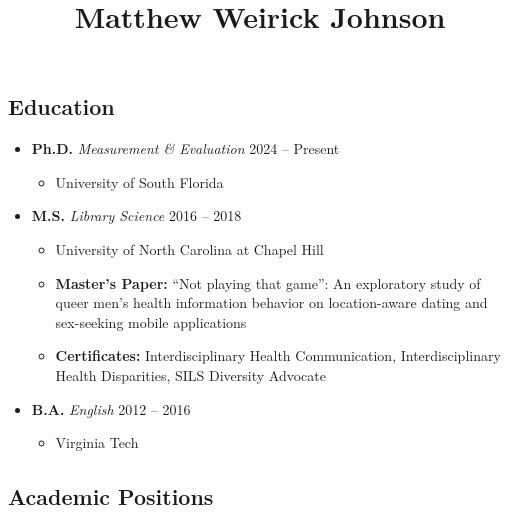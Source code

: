 \documentclass[
  letterpaper,
  DIV=11,
  numbers=noendperiod]{scrartcl}
\title{Matthew Weirick Johnson}
\author{}
\date{}
\providecommand{\tightlist}{%
  \setlength{\itemsep}{0pt}\setlength{\parskip}{0pt}}\usepackage{longtable,booktabs,array}
\begin{document}
\maketitle

\subsection{\texorpdfstring{ Education}{ Education}}\label{education}

\begin{itemize}
\tightlist
\item
  \textbf{Ph.D.} \emph{Measurement \& Evaluation} {2024 -- Present}

  \begin{itemize}
  \tightlist
  \item
    University of South Florida
  \end{itemize}
\item
  \textbf{M.S.} \emph{Library Science} {2016 -- 2018}

  \begin{itemize}
  \tightlist
  \item
    University of North Carolina at Chapel Hill
  \item
    \textbf{Master's Paper:} ``Not playing that game'': An exploratory
    study of queer men's health information behavior on location-aware
    dating and sex-seeking mobile applications
  \item
    \textbf{Certificates:} Interdisciplinary Health Communication,
    Interdisciplinary Health Disparities, SILS Diversity Advocate
  \end{itemize}
\end{itemize}

\begin{itemize}
\tightlist
\item
  \textbf{B.A.} \emph{English} {2012 -- 2016}

  \begin{itemize}
  \tightlist
  \item
    Virginia Tech
  \end{itemize}
\end{itemize}

\subsection{\texorpdfstring{ Academic
Positions}{ Academic Positions}}\label{academic-positions}
\end{document}
